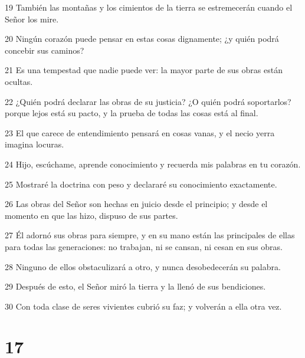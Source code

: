 \par 19 También las montañas y los cimientos de la tierra se estremecerán cuando el Señor los mire.
\par 20 Ningún corazón puede pensar en estas cosas dignamente; ¿y quién podrá concebir sus caminos?
\par 21 Es una tempestad que nadie puede ver: la mayor parte de sus obras están ocultas.
\par 22 ¿Quién podrá declarar las obras de su justicia? ¿O quién podrá soportarlos? porque lejos está su pacto, y la prueba de todas las cosas está al final.
\par 23 El que carece de entendimiento pensará en cosas vanas, y el necio yerra imagina locuras.
\par 24 Hijo, escúchame, aprende conocimiento y recuerda mis palabras en tu corazón.
\par 25 Mostraré la doctrina con peso y declararé su conocimiento exactamente.
\par 26 Las obras del Señor son hechas en juicio desde el principio; y desde el momento en que las hizo, dispuso de sus partes.
\par 27 Él adornó sus obras para siempre, y en su mano están las principales de ellas para todas las generaciones: no trabajan, ni se cansan, ni cesan en sus obras.
\par 28 Ninguno de ellos obstaculizará a otro, y nunca desobedecerán su palabra.
\par 29 Después de esto, el Señor miró la tierra y la llenó de sus bendiciones.
\par 30 Con toda clase de seres vivientes cubrió su faz; y volverán a ella otra vez.

\chapter{17}


